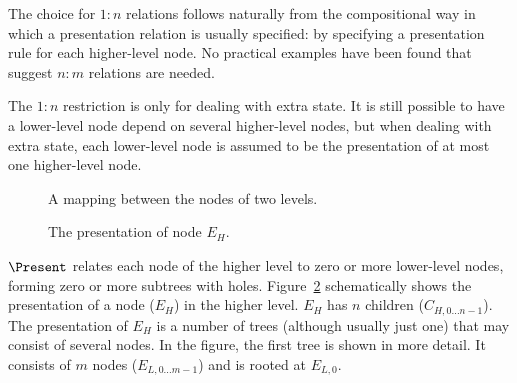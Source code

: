 The choice for $1:n$ relations follows naturally from the compositional way in which a presentation relation is usually specified: by specifying a presentation rule for each higher-level node. No practical examples have been found that suggest $n:m$ relations are needed. 

The $1:n$ restriction is only for dealing with extra state. It is still possible to have a lower-level node depend on several higher-level nodes, but when dealing with extra state, each lower-level node is assumed to be the presentation of at most one higher-level node. 



\begin{figure}
\begin{center}
\begin{center}
\end{center}
\caption{A mapping between the nodes of two levels.}\label{nodeMapping} 
\end{center}
\end{figure}



\begin{figure}
\begin{center}
\begin{center}
%                    
\end{center}
\caption{The presentation of node $E_H$.}\label{nodePresentation} 
\end{center}
\end{figure}

$\Present$ relates each node of the higher level to zero or more lower-level nodes, forming zero or more subtrees with holes. Figure~\ref{nodePresentation} schematically shows the presentation of a node ($E_H$) in the higher level. $E_H$ has $n$ children ($C_{H,0\dots n-1}$). The presentation of $E_H$ is a number of trees (although usually just one) that may consist of several nodes. In the figure, the first tree is shown in more detail. It consists of $m$ nodes ($E_{L,0\dots m-1}$) and is rooted at $E_{L,0}$. 

